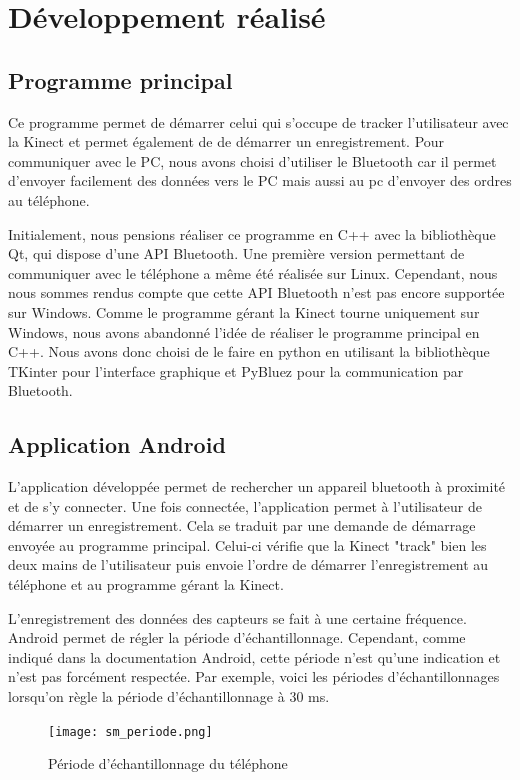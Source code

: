 \documentclass[12pt, french]{article}
\begin{document}
\section{Développement réalisé}

\subsection{Programme principal}
Ce programme permet de démarrer celui qui s'occupe de tracker l'utilisateur avec la Kinect et permet également de de démarrer un enregistrement.
Pour communiquer avec le PC, nous avons choisi d'utiliser le Bluetooth car il permet d'envoyer facilement des données vers le PC mais aussi au pc d'envoyer des ordres au téléphone.

Initialement, nous pensions réaliser ce programme en C++ avec la bibliothèque Qt, qui dispose d'une API Bluetooth. Une première version permettant de communiquer avec le téléphone a même été réalisée sur Linux. Cependant, nous nous sommes rendus compte que cette API Bluetooth n'est pas encore supportée sur Windows. Comme le programme gérant la Kinect tourne uniquement sur Windows, nous avons abandonné l'idée de réaliser le programme principal en C++. Nous avons donc choisi de le faire en python en utilisant la bibliothèque TKinter pour l'interface graphique et PyBluez pour la communication par Bluetooth.



\subsection{Application Android}
L'application développée permet de rechercher un appareil bluetooth à proximité et de s'y connecter. Une fois connectée, l'application permet à l'utilisateur de démarrer un enregistrement. Cela se traduit par une demande de démarrage envoyée au programme principal. Celui-ci vérifie que la Kinect "track" bien les deux mains de l'utilisateur puis envoie  l'ordre de démarrer l'enregistrement au téléphone et au programme gérant la Kinect.

L'enregistrement des données des capteurs se fait à une certaine fréquence. Android permet de régler la période d'échantillonnage. Cependant, comme indiqué dans la documentation Android, cette période n'est qu'une indication et n'est pas forcément respectée. Par exemple, voici les périodes d'échantillonnages lorsqu'on règle la période d'échantillonnage à 30 ms.

\begin{figure}[H]
\centering
\texttt{[image: sm\_periode.png]}
\caption{Période d'échantillonnage du téléphone}
\label{fig1}
\end{figure}
\end{document}
